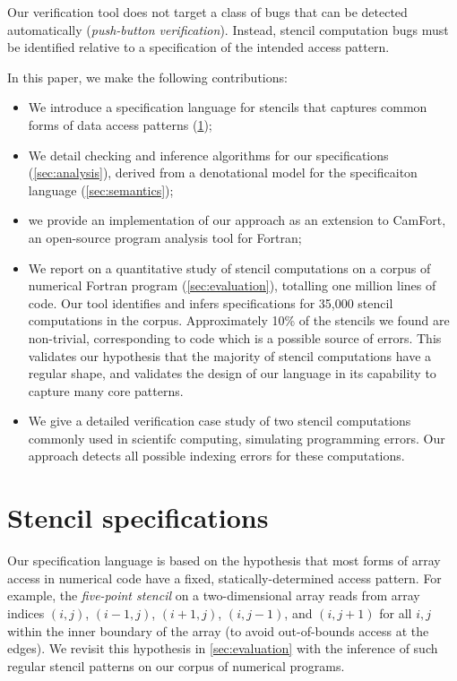 \documentclass[10pt,preprint]{sigplanconf}
\theoremstyle{definition}
\begin{document}
Our verification tool does not target a
class of bugs that can be detected automatically (\emph{push-button
  verification}). Instead, stencil computation bugs must be
identified relative to a specification of the intended access pattern.

In this paper, we make the following contributions:
%
\begin{itemize}
\item We introduce a specification language for stencils
  that captures common forms of data access patterns
  (\cref{sec:lang});

\item We detail checking and inference algorithms for our
  specifications (\cref{sec:analysis}), derived from a
  denotational model for the specificaiton language
  (\cref{sec:semantics});

\item we provide an implementation of our approach as an extension to
  CamFort, an open-source program analysis tool for Fortran;

\item We report on a quantitative study of stencil computations on a
  corpus of numerical Fortran program
  (\cref{sec:evaluation}), totalling one million lines of code. Our tool
  identifies and infers specifications for 35,000 stencil computations in the
  corpus. Approximately 10\% of the stencils we found are non-trivial,
  corresponding to code which is a possible source of errors. This validates
  our hypothesis that the majority of stencil computations have a regular
  shape, and validates the design of our language in its capability to capture
  many core patterns.

\item We give a detailed verification case study of two
  stencil computations commonly used in scientifc computing,
  simulating programming errors. Our approach detects all
  possible indexing errors for these computations.
\end{itemize}
%

\newcommand{\domainVal}{\mathbb{Z}_\infty}
\section{Stencil specifications}\label{sec:lang}

Our specification language is based on the hypothesis
that most forms of array access in numerical code have
a fixed, statically-determined access pattern. For example, the
\emph{five-point stencil} on a two-dimensional array reads from array
indices $(i, j)$, $(i-1, j)$, $(i+1, j)$, $(i, j-1)$, and $(i, j+1)$
for all $i, j$ within the inner boundary of the array (to avoid
out-of-bounds access at the edges). We revisit this hypothesis
in \cref{sec:evaluation} with the inference of
such regular stencil patterns on our corpus of numerical programs.
\end{document}
